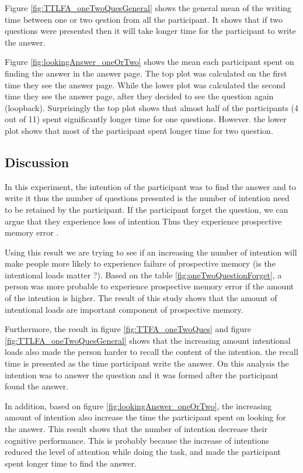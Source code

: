 Figure \ref{fig:TTLFA_oneTwoQuesGeneral} shows the general mean of the writing time between one or two qestion from all the participant.
It shows that if two questions were presented then it will take longer time for the participant to write the answer.

Figure \ref{fig:lookingAnswer_oneOrTwo} shows the mean each participant spent on finding the answer in the answer page.
 The top plot was calculated on the first time they see the answer page.
 While the lower plot was calculated the second time they see the answer page, after they decided to see the question again (loopback).
Surprisingly the top plot shows that almost half of the participants (4 out of 11) spent significantly longer time for one questions.
However. the lower plot shows that most of the participant spent longer time for two question.

\subsection{Discussion}

In this experiment, the intention of the participant was to find the answer and to write it
thus the number of questions presented is the number of intention need to be retained by the participant.
If the participant forget the question, we can argue that they experience loss of intention Thus they experience
prospective memory error \citep{Reason1984}.

Using this result we are trying to see  if an increasing the number of intention will make people more likely to experience failure of prospective memory
(is the intentional loads matter ?).
Based on the table \ref{fig:oneTwoQuestionForget}, a person was more probable to experience prospective memory error if the amount of the intention is higher.
The result of this study shows that the amount of intentional loads are important component of prospective memory.

Furthermore, the result in figure \ref{fig:TTFA_oneTwoQues} and figure \ref{fig:TTLFA_oneTwoQuesGeneral} shows that the increasing amount intentional loads also
made the person harder to recall the content of the intention. the recall time is presented as the time participant write the answer.
On this analysis the intention was to answer the question and it was formed after the participant found the answer.

In addition, based on figure \ref{fig:lookingAnswer_oneOrTwo}, the increasing amount of intention also increase the time
the participant spent on looking for the answer. This result shows that the number of intention decrease their cognitive performance.
This is probably because the increase of intentions reduced the level of attention while doing the task, and made
the participant spent longer time to find the answer.


